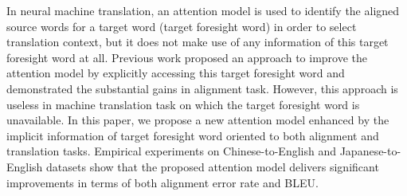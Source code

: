 In neural machine translation, an attention model is used to identify the aligned source words for a target word (target foresight word) in order to select translation context, but it does not make use of any information of this target foresight word at all. Previous work proposed an approach to improve the attention model by explicitly accessing this target foresight word and demonstrated the substantial gains in alignment task. However, this approach is useless in machine translation task on which the target foresight word is unavailable. In this paper, we propose a new attention model enhanced by the implicit information of target foresight word oriented to both alignment and translation tasks. Empirical experiments on Chinese-to-English and Japanese-to-English datasets show that the proposed attention model delivers significant improvements in terms of both alignment error rate and BLEU.
